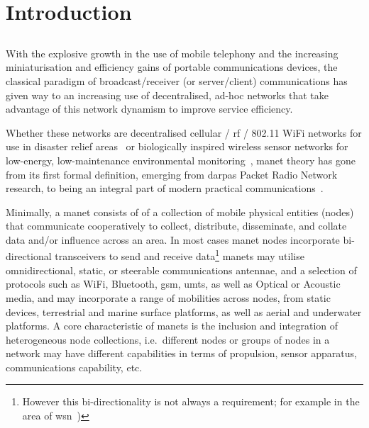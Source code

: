 
\chapter{Introduction}
\label{ch:introduction}

\section{}\label{manets}

With the explosive growth in the use of mobile telephony and the increasing miniaturisation and efficiency gains of portable communications devices, the classical paradigm of broadcast/receiver (or server/client) communications has given way to an increasing use of decentralised, ad-hoc networks that take advantage of this network dynamism to improve service efficiency.

Whether these networks are decentralised cellular / \gls{rf} / 802.11 WiFi networks for use in disaster relief areas~\cite{Milliken2015} or biologically inspired wireless sensor networks for low-energy, low-maintenance environmental monitoring~\cite{Nicholson2008,Selvakennedy2007}, \gls{manet} theory has gone from its first formal definition, emerging from \glspl{darpa} Packet Radio Network research, to being an integral part of modern practical communications~\cite{Jubin1987}.

Minimally, a \gls{manet} consists of of a collection of mobile physical entities (nodes) that communicate cooperatively to collect, distribute, disseminate, and collate data and/or influence across an area.
In most cases \gls{manet} nodes incorporate bi-directional transceivers to send and receive data\footnote{However this bi-directionality is not always a requirement; for example in the area of \gls{wsn}~\cite{Akyildiz2002})}
\glspl{manet} may utilise omnidirectional, static, or steerable communications antennae, and a selection of protocols such as WiFi, Bluetooth, \gls{gsm}, \gls{umts}, as well as Optical or Acoustic media, and may incorporate a range of mobilities across nodes, from static devices, terrestrial and marine surface platforms, as well as aerial and underwater platforms.
A core characteristic of \glspl{manet} is the inclusion and integration of heterogeneous node collections, i.e.\ different nodes or groups of nodes in a network may have different capabilities in terms of propulsion, sensor apparatus, communications capability, etc.

